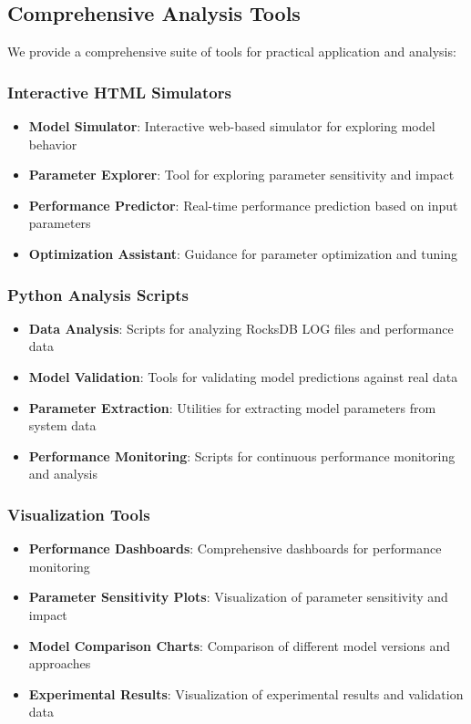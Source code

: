 \documentclass[11pt]{article}
\begin{document}
\subsection{Comprehensive Analysis Tools}

We provide a comprehensive suite of tools for practical application and analysis:

\subsubsection{Interactive HTML Simulators}
\begin{itemize}
    \item \textbf{Model Simulator}: Interactive web-based simulator for exploring model behavior
    \item \textbf{Parameter Explorer}: Tool for exploring parameter sensitivity and impact
    \item \textbf{Performance Predictor}: Real-time performance prediction based on input parameters
    \item \textbf{Optimization Assistant}: Guidance for parameter optimization and tuning
\end{itemize}

\subsubsection{Python Analysis Scripts}
\begin{itemize}
    \item \textbf{Data Analysis}: Scripts for analyzing RocksDB LOG files and performance data
    \item \textbf{Model Validation}: Tools for validating model predictions against real data
    \item \textbf{Parameter Extraction}: Utilities for extracting model parameters from system data
    \item \textbf{Performance Monitoring}: Scripts for continuous performance monitoring and analysis
\end{itemize}

\subsubsection{Visualization Tools}
\begin{itemize}
    \item \textbf{Performance Dashboards}: Comprehensive dashboards for performance monitoring
    \item \textbf{Parameter Sensitivity Plots}: Visualization of parameter sensitivity and impact
    \item \textbf{Model Comparison Charts}: Comparison of different model versions and approaches
    \item \textbf{Experimental Results}: Visualization of experimental results and validation data
\end{itemize}
\end{document}
